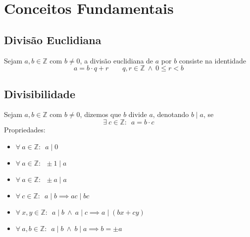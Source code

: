 \documentclass{article}
\begin{document}
\section{Conceitos Fundamentais}

\subsection{Divisão Euclidiana}
Sejam $a, b \in \mathbb{Z}$ com $b \neq 0$, a divisão euclidiana de $a$ por $b$ consiste na identidade
\[ a = b \cdot q + r \qquad q, r \in \mathbb{Z} \> \land \> 0 \leq r < b \]


\subsection{Divisibilidade}
Sejam $a, b \in \mathbb{Z}$ com $b \neq 0$, dizemos que $b$ divide $a$, denotando $b \mid a$, se
\[ \exists \> c \in \mathbb{Z}: \enspace a = b \cdot c \]
Propriedades:
\begin{itemize}
  \item $\forall \> a \in \mathbb{Z}: \enspace a \mid 0$
  \item $\forall \> a \in \mathbb{Z}: \enspace \pm 1 \mid a$
  \item $\forall \> a \in \mathbb{Z}: \enspace \pm a \mid a$
  \item $\forall \> c \in \mathbb{Z}: \enspace a \mid b \implies ac \mid bc$
  \item $\forall \> x, y \in \mathbb{Z}: \enspace a \mid b \> \land \> a \mid c \implies a \mid (bx + cy)$
  \item $\forall \> a, b \in \mathbb{Z}: \enspace a \mid b \> \land \> b \mid a \implies b = \pm a$
\end{itemize}
\end{document}
